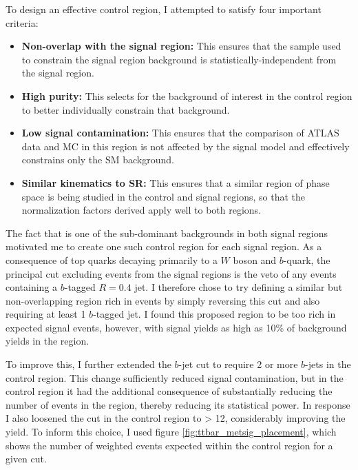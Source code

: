 To design an effective control region, I attempted to satisfy four important criteria:
\begin{itemize}
  \item \textbf{Non-overlap with the signal region:} This ensures that the sample used to constrain the signal region background is statistically-independent from the signal region.
  \item \textbf{High \ttbar purity:} This selects for the background of interest in the control region to better individually constrain that background.
  \item \textbf{Low signal contamination:} This ensures that the comparison of ATLAS data and MC in this region is not affected by the signal model and effectively constrains only the SM background.
  \item \textbf{Similar kinematics to SR:} This ensures that a similar region of phase space is being studied in the control and signal regions, so that the normalization factors derived apply well to both regions.
\end{itemize}

The fact that \ttbar is one of the sub-dominant backgrounds in both signal regions motivated me to create one such control region for each signal region. As a consequence of top quarks decaying primarily to a $W$ boson and $b$-quark, the principal cut excluding \ttbar events from the signal regions is the veto of any events containing a $b$-tagged \akt $R=0.4$ jet. I therefore chose to try defining a similar but non-overlapping region rich in \ttbar events by simply reversing this cut and also requiring at least 1 $b$-tagged jet. I found this proposed region to be too rich in expected signal events, however, with signal yields as high as 10\% of background yields in the \merged region.

To improve this, I further extended the $b$-jet cut to require 2 or more $b$-jets in the control region. This change sufficiently reduced signal contamination, but in the \merged control region it had the additional consequence of substantially reducing the number of events in the region, thereby reducing its statistical power.  In response I also loosened the \metsig cut in the \merged \ttbar control region to \metsig > 12, considerably improving the \ttbar yield. To inform this choice, I used figure \ref{fig:ttbar_metsig_placement}, which shows the number of weighted \ttbar events expected within the \merged control region for a given \metsig cut.

